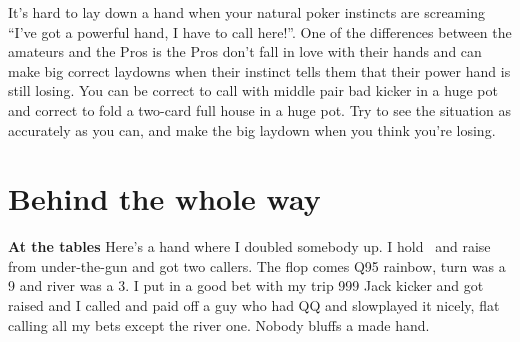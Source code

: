 It's hard to lay down a hand when your natural poker instincts are
screaming ``I've got a powerful hand, I have to call here!''. One of
the differences between the amateurs and the Pros is the Pros don't
fall in love with their hands and can make big correct laydowns when
their instinct tells them that their power hand is still losing.
You can be correct to call with middle pair bad kicker in a huge pot
and correct to fold a two-card full house in a huge pot. Try to see
the situation as accurately as you can, and make the big laydown when
you think you're losing.

\section{Behind the whole way}

\textbf{At the tables} Here's a hand where I doubled somebody up. I
hold \Jd\nined\ and raise from under-the-gun and got two callers. The
flop comes Q95 rainbow, turn was a 9 and river was a 3. I put in a
good bet with my trip 999 Jack kicker and got raised and I called and
paid off a guy who had QQ and slowplayed it nicely, flat calling all
my bets except the river one. Nobody bluffs a made hand.

